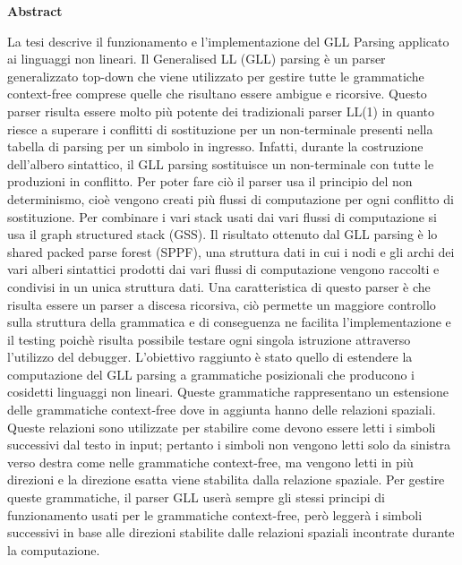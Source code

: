 \documentclass[12pt]{article}
\begin{document}
	\begin{center}
		{\huge\bf Abstract}\par
	\end{center}
	La tesi descrive il funzionamento e l'implementazione del GLL Parsing applicato ai linguaggi non lineari. Il Generalised LL (GLL) parsing è un parser generalizzato top-down che viene utilizzato per gestire tutte le grammatiche context-free comprese quelle che risultano essere ambigue e ricorsive. Questo parser risulta essere molto più potente dei tradizionali parser LL(1) in quanto riesce a superare i conflitti di sostituzione per un non-terminale presenti nella tabella di parsing per un simbolo in ingresso. Infatti, durante la costruzione dell'albero sintattico, il GLL parsing sostituisce un non-terminale con tutte le produzioni in conflitto. Per poter fare ciò il parser usa il principio del non determinismo, cioè vengono creati più flussi di computazione per ogni conflitto di sostituzione. Per combinare i vari stack usati dai vari flussi di computazione si usa il graph structured stack (GSS). Il risultato ottenuto dal GLL parsing è lo shared packed parse forest (SPPF), una struttura dati in cui i nodi e gli archi dei vari alberi sintattici prodotti dai vari flussi di computazione vengono raccolti e condivisi in un unica struttura dati. Una caratteristica di questo parser è che risulta essere un parser a discesa ricorsiva, ciò permette un maggiore controllo sulla struttura della grammatica e di conseguenza ne facilita l'implementazione e il testing poichè risulta possibile testare ogni singola istruzione attraverso l'utilizzo del debugger. L'obiettivo raggiunto è stato quello di estendere la computazione del GLL parsing a grammatiche posizionali che producono i cosidetti linguaggi non lineari. Queste grammatiche rappresentano un estensione delle grammatiche context-free dove in aggiunta hanno delle relazioni spaziali. Queste relazioni sono utilizzate per stabilire come devono essere letti i simboli successivi dal testo in input; pertanto i simboli non vengono letti solo da sinistra verso destra come nelle grammatiche context-free, ma vengono letti in più direzioni e la direzione esatta viene stabilita dalla relazione spaziale. Per gestire queste grammatiche, il parser GLL userà sempre gli stessi principi di funzionamento usati per le grammatiche context-free, però leggerà i simboli successivi in base alle direzioni stabilite dalle relazioni spaziali incontrate durante la computazione.
\end{document}
